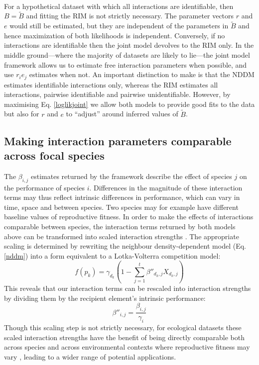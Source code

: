 \documentclass[a4,12pt]{article}
\begin{document}
\begin{refsection}
    \paragraph{}
    For a hypothetical dataset with which all interactions are identifiable, then $B = \tilde B$ and fitting the RIM is not strictly necessary. The parameter vectors $r$ and $e$ would still be estimated, but they are independent of the parameters in $\tilde B$ and hence maximization of both likelihoods is independent. Conversely, if no interactions are identifiable then the joint model devolves to the RIM only. In the middle ground---where the majority of datasets are likely to lie---the joint model framework allows us to estimate free interaction parameters when possible, and use $r_i e_j$ estimates when not. An important distinction to make is that the NDDM estimates identifiable interactions only, whereas the RIM estimates all interactions, pairwise identifiable and pairwise unidentifiable. However, by maximising Eq. \ref{loglikjoint} we allow both models to provide good fits to the data but also for $r$ and $e$ to ``adjust'' around inferred values of $\tilde B$. 


    \subsection{Making interaction parameters comparable across focal species} 

        The $\beta_{i, j}$ estimates returned by the framework describe the effect of species $j$ on the performance of species $i$. Differences in the magnitude of these interaction terms may thus reflect intrinsic differences in performance, which can vary in time, space and between species. Two species may for example have different baseline values of reproductive fitness. In order to make the effects of interactions comparable between species, the interaction terms returned by both models above can be transformed into scaled interaction strengths \parencite{Laska1998}. The appropriate scaling is determined by rewriting the neighbour density-dependent model (Eq. \ref{nddm}) into a form equivalent to a Lotka-Volterra competition model: 
        \begin{equation}
        f(p_{k}) = \gamma_{d_k} \left ( 1 - \sum_{j=1}^{t} {\beta}''_{d_k, j} X_{d_k, j} \right )
        \label{LVform}
        \end{equation}
        This reveals that our interaction terms can be rescaled into interaction strengths by dividing them by the recipient element's intrinsic performance:  
        \begin{equation}
        {\beta}''_{i, j} = \frac{\beta_{i, j}}{\gamma_{i}}
        \label{scaling}
        \end{equation}
        Though this scaling step is not strictly necessary, for ecological datasets these scaled interaction strengths have the benefit of being directly comparable both across species and across environmental contexts where reproductive fitness may vary \parencite{Wootton2005}, leading to a wider range of potential applications.


\end{refsection}
\end{document}
